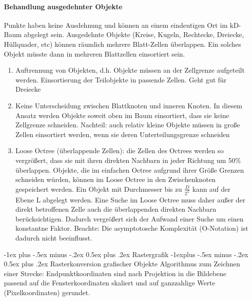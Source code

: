 \documentclass[10pt,landscape]{article}
\makeatletter
\renewcommand{\section}{\@startsection{section}{1}{0mm}%
                                {-1ex plus -.5ex minus -.2ex}%
                                {0.5ex plus .2ex}%
                                {\normalfont\large\bfseries}}
\renewcommand{\subsection}{\@startsection{subsection}{2}{0mm}%
                                {-1explus -.5ex minus -.2ex}%
                                {0.5ex plus .2ex}%
                                {\normalfont\normalsize\bfseries}}
\makeatother
\begin{document}
\begin{multicols}{3}
  \paragraph*{Behandlung ausgedehnter Objekte}
  Punkte haben keine Ausdehnung und können an einem eindeutigen Ort im kD-Baum abgelegt sein. Ausgedehnte Objekte (Kreise, Kugeln, Rechtecke, Dreiecke, Hüllquader, etc) können räumlich mehrere Blatt-Zellen überlappen. Ein solches Objekt müsste dann in mehreren Blattzellen einsortiert sein.
  \begin{enumerate}
    \item Auftrennung von Objekten, d.h. Objekte müssen an der Zellgrenze aufgeteilt werden. Einsortierung der Teilobjekte in passende Zellen. Geht gut für Dreiecke
    \item Keine Unterscheidung zwischen Blattknoten und inneren Knoten. In diesem Ansatz werden Objekte soweit oben im Baum einsortiert, dass sie keine Zellgrenze schneiden. Nachteil: auch relativ kleine Objekte müssen in große Zellen einsortiert werden, wenn sie deren Unterteilungsgrenze schneiden
    \item Loose Octree (überlappende Zellen): die Zellen des Octrees werden so vergrößert, dass sie mit ihren direkten Nachbarn in jeder Richtung um 50\% überlappen. Objekte, die im einfachen Octree aufgrund ihrer Größe Grenzen schneiden würden, können im Loose Octree in den Zwischenknoten gespeichert werden. Ein Objekt mit Durchmesser bis zu $\frac{D}{2^L}$ kann auf der Ebene L abgelegt werden. Eine Suche im Loose Octree muss daher außer der direkt betroffenen Zelle auch die überlappenden direkten Nachbarn berücksichtigen. Dadurch vergrößert sich der Aufwand einer Suche um einen konstantne Faktor. Beachte: Die asymptotosche Komplexität (O-Notation) ist dadurch nicht beeinflusst.
  \end{enumerate}
  
  \section{Rastergrafik}
  \subsection{ Rasterkonversion grafischer Objekte}
  Algorithmus zum Zeichnen einer Strecke: Endpunktkoordinaten sind nach Projektion in die Bildebene passend auf die Fensterkoordinaten skaliert und auf ganzzahlige Werte (Pixelkoordinaten) gerundet.
  

\end{multicols}
\end{document}
